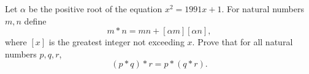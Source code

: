 Let $\alpha$ be the positive root of the equation $x^2 = 1991x + 1$. For natural numbers $m, n$ define
\[ m * n = mn + [\alpha m][\alpha n], \]
where $[x]$ is the greatest integer not exceeding $x$. Prove that for all natural numbers $p, q, r$,
\[ (p * q) * r = p * (q * r). \]
